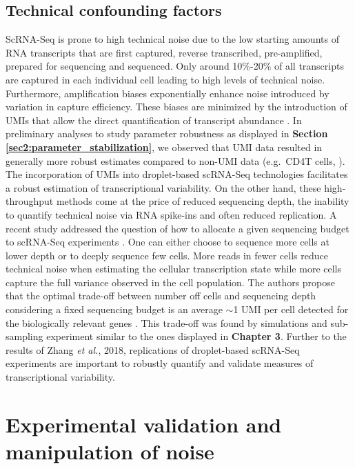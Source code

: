 \subsection{Technical confounding factors}

ScRNA-Seq is prone to high technical noise due to the low starting amounts of RNA transcripts that are first captured, reverse transcribed, pre-amplified, prepared for sequencing and sequenced. Only around 10\%-20\% of all transcripts are captured in each individual cell leading to high levels of technical noise. Furthermore, amplification biases exponentially enhance noise introduced by variation in capture efficiency. These biases are minimized by the introduction of \glspl{UMI} that allow the direct quantification of transcript abundance \cite{Islam2014}. In preliminary analyses to study parameter robustness as displayed in \textbf{Section \ref{sec2:parameter_stabilization}}, we observed that UMI data \citep{Zeisel2015} resulted in generally more robust estimates compared to non-UMI data (e.g.~CD4\plus T cells, \citep{Martinez-jimenez2017}).\\

The incorporation of UMIs into droplet-based scRNA-Seq technologies facilitates a robust estimation of transcriptional variability. On the other hand, these high-throughput methods come at the price of reduced sequencing depth, the inability to quantify technical noise via RNA spike-ins and often reduced replication. A recent study addressed the question of how to allocate a given sequencing budget to scRNA-Seq experiments \citep{Zhang2018}. One can either choose to sequence more cells at lower depth or to  deeply sequence few cells. More reads in fewer cells reduce technical noise when estimating the cellular transcription state while more cells capture the full variance observed in the cell population. The authors propose that the optimal trade-off between number off cells and sequencing depth considering a fixed sequencing budget is an average $\sim$1 UMI per cell detected for the biologically relevant genes \citep{Zhang2018}. This trade-off was found by simulations and sub-sampling experiment similar to the ones displayed in \textbf{Chapter 3}. Further to the results of Zhang \emph{et al.}, 2018, replications of droplet-based scRNA-Seq experiments are important to robustly quantify and validate measures of transcriptional variability. 

\section{Experimental validation and manipulation of noise}

